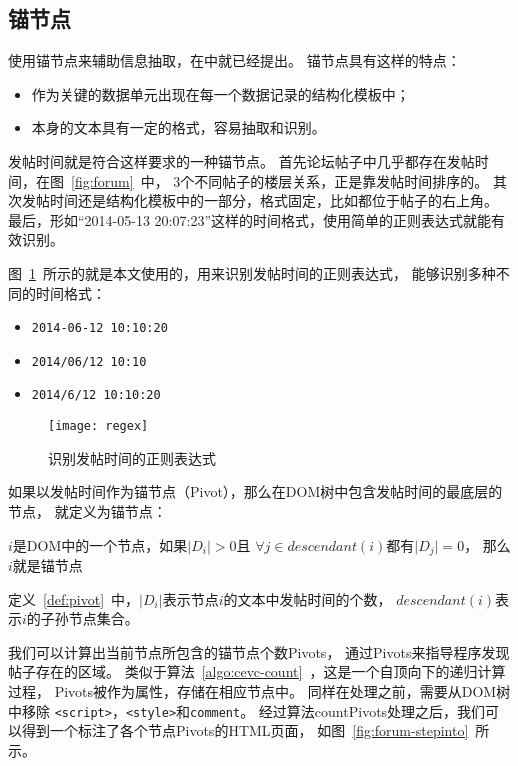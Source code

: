 \subsection{锚节点}
使用锚节点来辅助信息抽取，在\cite{song2010automatic}中就已经提出。
锚节点具有这样的特点：
\begin{itemize}
\item 作为关键的数据单元出现在每一个数据记录的结构化模板中；
\item 本身的文本具有一定的格式，容易抽取和识别。
\end{itemize}

发帖时间就是符合这样要求的一种锚节点。
首先论坛帖子中几乎都存在发帖时间，在图~\ref{fig:forum}~中，
3个不同帖子的楼层关系，正是靠发帖时间排序的。
其次发帖时间还是结构化模板中的一部分，格式固定，比如都位于帖子的右上角。
最后，形如“2014-05-13 20:07:23”这样的时间格式，使用简单的正则表达式就能有效识别。

图~\ref{fig:regex}~所示的就是本文使用的，用来识别发帖时间的正则表达式，
能够识别多种不同的时间格式：
\begin{itemize}
\item \texttt{2014-06-12 10:10:20}
\item \texttt{2014/06/12 10:10}
\item \texttt{2014/6/12 10:10:20}
\end{itemize}

\begin{figure}[htbp]
\centering
\texttt{[image: regex]}
\caption{识别发帖时间的正则表达式}
\label{fig:regex}
\end{figure}

如果以发帖时间作为锚节点（Pivot），那么在DOM树中包含发帖时间的最底层的节点，
就定义为锚节点：

\begin{definition}
\label{def:pivot}
$i$是DOM中的一个节点，如果$\vert D_i \vert > 0$且
$\forall j \in descendant(i)$都有$\vert D_j \vert = 0$，
那么$i$就是锚节点
\end{definition}

定义~\ref{def:pivot}~中，$\vert D_i \vert$表示节点$i$的文本中发帖时间的个数，
$descendant(i)$表示$i$的子孙节点集合。

我们可以计算出当前节点所包含的锚节点个数Pivots，
通过Pivots来指导程序发现帖子存在的区域。
类似于算法~\ref{algo:cevc-count}~，这是一个自顶向下的递归计算过程，
Pivots被作为属性，存储在相应节点中。
同样在处理之前，需要从DOM树中移除
\texttt{<script>}，\texttt{<style>}和\texttt{comment}。
经过算法countPivots处理之后，我们可以得到一个标注了各个节点Pivots的HTML页面，
如图~\ref{fig:forum-stepinto}~所示。

